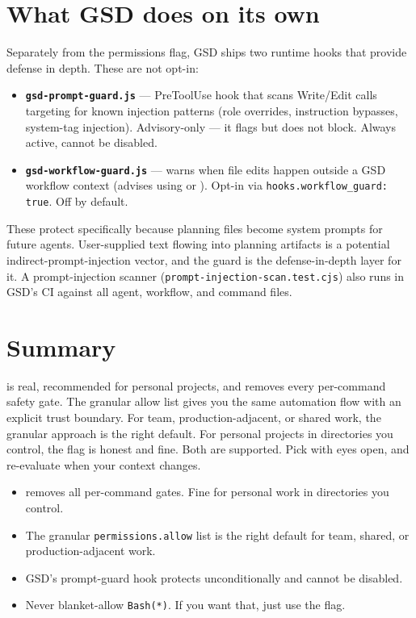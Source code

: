 \documentclass[11pt,letterpaper,openany]{book}
\begin{document}
\section{What GSD does on its own}

Separately from the permissions flag, GSD ships two runtime hooks that provide defense in depth. These are not opt-in:

\begin{itemize}[itemsep=2pt]
  \item \textbf{\texttt{gsd-prompt-guard.js}} --- PreToolUse hook that scans Write/Edit calls targeting  for known injection patterns (role overrides, instruction bypasses, system-tag injection). Advisory-only --- it flags but does not block. Always active, cannot be disabled.
  \item \textbf{\texttt{gsd-workflow-guard.js}} --- warns when file edits happen outside a GSD workflow context (advises using  or ). Opt-in via \texttt{hooks.workflow\_guard: true}. Off by default.
\end{itemize}

These protect  specifically because planning files become system prompts for future agents. User-supplied text flowing into planning artifacts is a potential indirect-prompt-injection vector, and the guard is the defense-in-depth layer for it. A prompt-injection scanner (\texttt{prompt-injection-scan.test.cjs}) also runs in GSD's CI against all agent, workflow, and command files.

\section{Summary}

 is real, recommended for personal projects, and removes every per-command safety gate. The granular allow list gives you the same automation flow with an explicit trust boundary. For team, production-adjacent, or shared work, the granular approach is the right default. For personal projects in directories you control, the flag is honest and fine. Both are supported. Pick with eyes open, and re-evaluate when your context changes.

\begin{gsdnote}[title=Key Takeaways]
\begin{itemize}[itemsep=2pt,leftmargin=1.2em]
  \item {} removes all per-command gates. Fine for personal work in directories you control.
  \item The granular \texttt{permissions.allow} list is the right default for team, shared, or production-adjacent work.
  \item GSD's prompt-guard hook protects  unconditionally and cannot be disabled.
  \item Never blanket-allow \texttt{Bash(*)}. If you want that, just use the flag.
\end{itemize}
\end{gsdnote}
\end{document}

